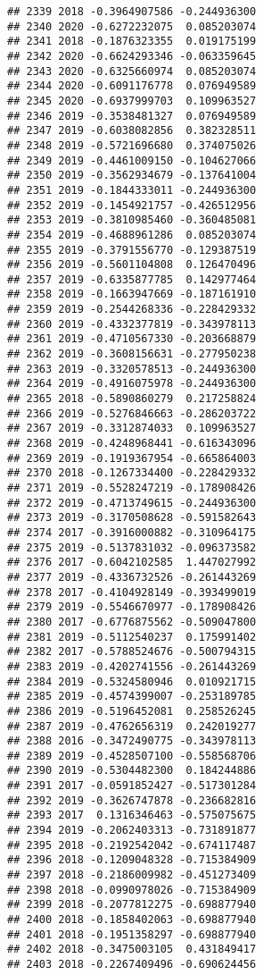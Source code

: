 \documentclass[
]{article}
\begin{document}
\begin{verbatim}
## 2339 2018 -0.3964907586 -0.244936300
## 2340 2020 -0.6272232075  0.085203074
## 2341 2018 -0.1876323355  0.019175199
## 2342 2020 -0.6624293346 -0.063359645
## 2343 2020 -0.6325660974  0.085203074
## 2344 2020 -0.6091176778  0.076949589
## 2345 2020 -0.6937999703  0.109963527
## 2346 2019 -0.3538481327  0.076949589
## 2347 2019 -0.6038082856  0.382328511
## 2348 2019 -0.5721696680  0.374075026
## 2349 2019 -0.4461009150 -0.104627066
## 2350 2019 -0.3562934679 -0.137641004
## 2351 2019 -0.1844333011 -0.244936300
## 2352 2019 -0.1454921757 -0.426512956
## 2353 2019 -0.3810985460 -0.360485081
## 2354 2019 -0.4688961286  0.085203074
## 2355 2019 -0.3791556770 -0.129387519
## 2356 2019 -0.5601104808  0.126470496
## 2357 2019 -0.6335877785  0.142977464
## 2358 2019 -0.1663947669 -0.187161910
## 2359 2019 -0.2544268336 -0.228429332
## 2360 2019 -0.4332377819 -0.343978113
## 2361 2019 -0.4710567330 -0.203668879
## 2362 2019 -0.3608156631 -0.277950238
## 2363 2019 -0.3320578513 -0.244936300
## 2364 2019 -0.4916075978 -0.244936300
## 2365 2018 -0.5890860279  0.217258824
## 2366 2019 -0.5276846663 -0.286203722
## 2367 2019 -0.3312874033  0.109963527
## 2368 2019 -0.4248968441 -0.616343096
## 2369 2019 -0.1919367954 -0.665864003
## 2370 2018 -0.1267334400 -0.228429332
## 2371 2019 -0.5528247219 -0.178908426
## 2372 2019 -0.4713749615 -0.244936300
## 2373 2019 -0.3170508628 -0.591582643
## 2374 2017 -0.3916000882 -0.310964175
## 2375 2019 -0.5137831032 -0.096373582
## 2376 2017 -0.6042102585  1.447027992
## 2377 2019 -0.4336732526 -0.261443269
## 2378 2017 -0.4104928149 -0.393499019
## 2379 2019 -0.5546670977 -0.178908426
## 2380 2017 -0.6776875562 -0.509047800
## 2381 2019 -0.5112540237  0.175991402
## 2382 2017 -0.5788524676 -0.500794315
## 2383 2019 -0.4202741556 -0.261443269
## 2384 2019 -0.5324580946  0.010921715
## 2385 2019 -0.4574399007 -0.253189785
## 2386 2019 -0.5196452081  0.258526245
## 2387 2019 -0.4762656319  0.242019277
## 2388 2016 -0.3472490775 -0.343978113
## 2389 2019 -0.4528507100 -0.558568706
## 2390 2019 -0.5304482300  0.184244886
## 2391 2017 -0.0591852427 -0.517301284
## 2392 2019 -0.3626747878 -0.236682816
## 2393 2017  0.1316346463 -0.575075675
## 2394 2019 -0.2062403313 -0.731891877
## 2395 2018 -0.2192542042 -0.674117487
## 2396 2018 -0.1209048328 -0.715384909
## 2397 2018 -0.2186009982 -0.451273409
## 2398 2018 -0.0990978026 -0.715384909
## 2399 2018 -0.2077812275 -0.698877940
## 2400 2018 -0.1858402063 -0.698877940
## 2401 2018 -0.1951358297 -0.698877940
## 2402 2018 -0.3475003105  0.431849417
## 2403 2018 -0.2267409496 -0.690624456

\end{verbatim}
\end{document}
